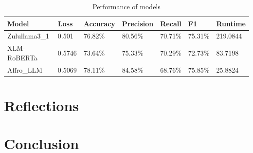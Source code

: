 \documentclass[11pt]{article}
\begin{document}
    \begin{table}[H]
    \centering
    \begin{tabular}{l l l l l l l }
    \toprule
    \textbf{Model} & \textbf{Loss} & \textbf{Accuracy} & \textbf{Precision} & \textbf{Recall} & \textbf{F1} & \textbf{Runtime} \\
    \midrule
    Zulullama3\_1
        & 0.501
        & 76.82\%
        & 80.56\%
        & 70.71\%
        & 75.31\%
        & 219.0844 \\
    XLM-RoBERTa
        & 0.5746
        & 73.64\%
        & 75.33\%
        & 70.29\%
        & 72.73\%
        & 83.7198 \\
    Affro\_LLM
        & 0.5069
        & 78.11\%
        & 84.58\%
        & 68.76\%
        & 75.85\%
        & 25.8824 \\
    \end{tabular}
    \caption{Performance of models}
    \end{table}

    \section{Reflections}

    \section{Conclusion}

    
    
\end{document}
